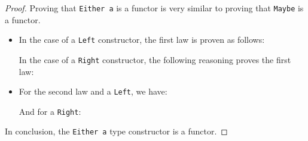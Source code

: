 \begin{example}
  \begin{proof}
    Proving that \texttt{Either a} is a functor is very similar to
    proving that \texttt{Maybe} is a functor.
    \begin{itemize}
    \item
      In the case of a \texttt{Left} constructor, the first law is
      proven as follows:
      \begin{steps}
      \end{steps}
      In the case of a \texttt{Right} constructor, the following
      reasoning proves the first law:
      \begin{steps}
      \end{steps}
    \item
      For the second law and a \texttt{Left}, we have:
      \begin{steps}
      \end{steps}
      And for a \texttt{Right}:
      \begin{steps}
      \end{steps}
    \end{itemize}
    In conclusion, the \texttt{Either a} type constructor is a
    functor.
  \end{proof}
\end{example}

